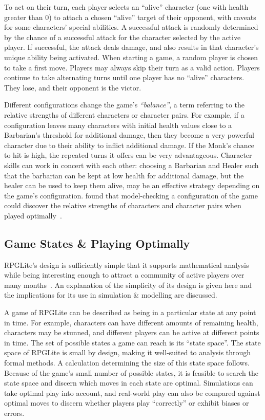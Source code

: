 To act on their turn, each player selects an
``alive'' character (one with health greater than 0) to attach a chosen
``alive'' target of their opponent, with caveats for some characters' special
abilities. A successful attack is randomly determined by the chance of a
successful attack for the character selected by the active player. If
successful, the attack deals damage, and also results in that character's unique
ability being activated. When starting a game, a random player is chosen to take
a first move. Players may always skip their turn as a valid action. Players
continue to take alternating turns until one player has no ``alive'' characters.
They lose, and their opponent is the victor.

Different configurations change the game's \emph{``balance''}, a term referring
to the relative strengths of different characters or character pairs. For
example, if a configuration leaves many characters with initial health values
close to a Barbarian's threshold for additional damage, then they become a very
powerful character due to their ability to inflict additional damage. If the
Monk's chance to hit is high, the repeated turns it offers can be very
advantageous. Character skills can work in concert with each other: choosing a
Barbarian and Healer such that the barbarian can be kept at low health for
additional damage, but the healer can be used to keep them alive, may be an
effective strategy depending on the game's configuration.
\citeauthor{kavanagh2019balancing} found that model-checking a configuration of
the game could discover the relative strengths of characters and character pairs
when played optimally~\cite{kavanagh2019balancing}.


\subsection{Game States \& Playing Optimally}
\label{rpglite_game_states}

RPGLite's design is sufficiently simple that it supports mathematical analysis
while being interesting enough to attract a community of active players over
many months~\cite{rpglite_dataset}. An explanation of the simplicity of its
design is given here and the implications for its use in simulation \& modelling
are discussed.

A game of RPGLite can be described as being in a particular state at any point
in time. For example, characters can have different amounts of remaining health,
characters may be stunned, and different players can be active at different
points in time. The set of possible states a game can reach is its ``state
space''. The state space of RPGLite is small by design, making it well-suited to
analysis through formal methods. A calculation determining the size of this
state space follows. Because of the game's small number of possible states, it
is feasible to search the state space and discern which moves in each state are
optimal. Simulations can take optimal play into account, and real-world play can
also be compared against optimal moves to discern whether players play
``correctly'' or exhibit biases or errors.

